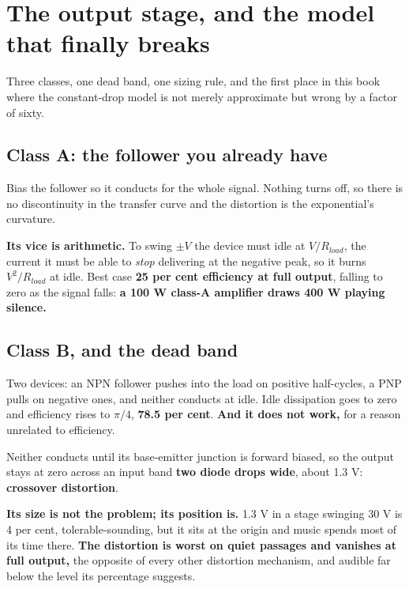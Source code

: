 
\section{The output stage, and the model that finally breaks}
\label{c8:app:b}

Three classes, one dead band, one sizing rule, and the first place in this book where the constant-drop model is not merely approximate but wrong by a factor of sixty.

\subsection{Class A: the follower you already have}
\label{c8:sec:b1}
Bias the follower so it conducts for the whole signal. Nothing turns off, so there is no discontinuity in the transfer curve and the distortion is the exponential's curvature.

\textbf{Its vice is arithmetic.} To swing $\pm V$ the device must idle at $V/R_{load}$, the current it must be able to \emph{stop} delivering at the negative peak, so it burns $V^2/R_{load}$ at idle. Best case \textbf{25 per cent efficiency at full output}, falling to zero as the signal falls: \textbf{a 100 W class-A amplifier draws 400 W playing silence.}

\subsection{Class B, and the dead band}
\label{c8:sec:b2}
Two devices: an NPN follower pushes into the load on positive half-cycles, a PNP pulls on negative ones, and neither conducts at idle. Idle dissipation goes to zero and efficiency rises to $\pi/4$, \textbf{78.5 per cent}. \textbf{And it does not work,} for a reason unrelated to efficiency.


Neither conducts until its base-emitter junction is forward biased, so the output stays at zero across an input band \textbf{two diode drops wide}, about 1.3 V: \textbf{crossover distortion}.

\textbf{Its size is not the problem; its position is.} 1.3 V in a stage swinging 30 V is 4 per cent, tolerable-sounding, but it sits at the origin and music spends most of its time there. \textbf{The distortion is worst on quiet passages and vanishes at full output,} the opposite of every other distortion mechanism, and audible far below the level its percentage suggests.

